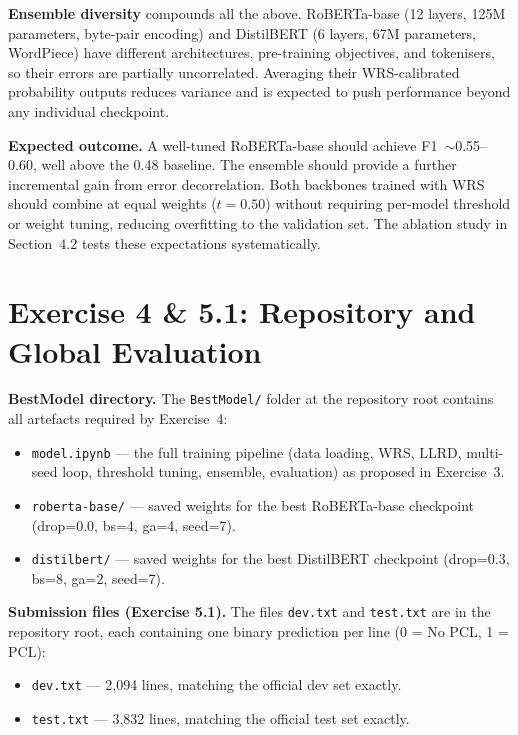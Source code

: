 \documentclass[11pt]{article}
\begin{document}
\textbf{Ensemble diversity} compounds all the above. RoBERTa-base (12 layers, 125M parameters, byte-pair encoding) and DistilBERT (6 layers, 67M parameters, WordPiece) have different architectures, pre-training objectives, and tokenisers, so their errors are partially uncorrelated. Averaging their WRS-calibrated probability outputs reduces variance and is expected to push performance beyond any individual checkpoint.

\textbf{Expected outcome.} A well-tuned RoBERTa-base should achieve F1~$\sim$0.55--0.60, well above the 0.48 baseline. The ensemble should provide a further incremental gain from error decorrelation. Both backbones trained with WRS should combine at equal weights ($t=0.50$) without requiring per-model threshold or weight tuning, reducing overfitting to the validation set. The ablation study in Section~4.2 tests these expectations systematically.

\clearpage
\section{Exercise 4 \& 5.1: Repository and Global Evaluation}

\textbf{BestModel directory.} The \texttt{BestModel/} folder at the repository root contains all artefacts required by Exercise~4:

\begin{itemize}[noitemsep]
    \item \texttt{model.ipynb} --- the full training pipeline (data loading, WRS, LLRD, multi-seed loop, threshold tuning, ensemble, evaluation) as proposed in Exercise~3.
    \item \texttt{roberta-base/} --- saved weights for the best RoBERTa-base checkpoint (drop=0.0, bs=4, ga=4, seed=7).
    \item \texttt{distilbert/} --- saved weights for the best DistilBERT checkpoint (drop=0.3, bs=8, ga=2, seed=7).
\end{itemize}

\textbf{Submission files (Exercise 5.1).} The files \texttt{dev.txt} and \texttt{test.txt} are in the repository root, each containing one binary prediction per line (0 = No PCL, 1 = PCL):

\begin{itemize}[noitemsep]
    \item \texttt{dev.txt} --- 2,094 lines, matching the official dev set exactly.
    \item \texttt{test.txt} --- 3,832 lines, matching the official test set exactly.
\end{itemize}
\end{document}
